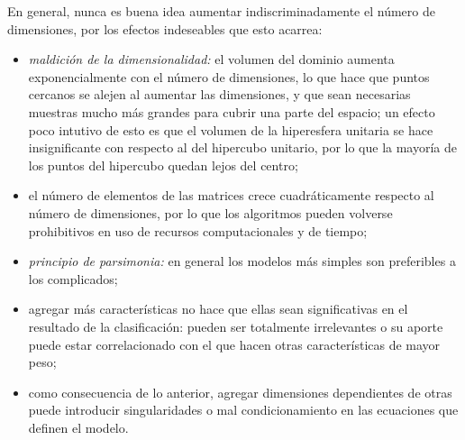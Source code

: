 \documentclass[spanish]{article}
\begin{document}
   En general, nunca es buena idea aumentar indiscriminadamente el número de dimensiones, por los
   efectos indeseables que esto acarrea:
   \begin{itemize}
       \item \emph{maldición de la dimensionalidad:} el volumen del dominio aumenta exponencialmente
           con el número de dimensiones, lo que hace que puntos cercanos se alejen al aumentar las
           dimensiones, y que sean necesarias muestras mucho más grandes para cubrir una parte del
           espacio;  un efecto poco intutivo de esto es que el volumen de la hiperesfera unitaria se
           hace insignificante con respecto al del hipercubo unitario, por lo que la mayoría de los
           puntos del hipercubo quedan lejos del centro;
       \item el número de elementos de las matrices crece cuadráticamente respecto al número de
           dimensiones, por lo que los algoritmos pueden volverse prohibitivos en uso de recursos
           computacionales y de tiempo;
       \item \emph{principio de parsimonia:} en general los modelos más simples son preferibles a
           los complicados;
       \item agregar más características no hace que ellas sean significativas en el resultado de la
           clasificación: pueden ser totalmente irrelevantes o su aporte puede estar correlacionado
           con el que hacen otras características de mayor peso;
       \item como consecuencia de lo anterior, agregar dimensiones dependientes de otras puede
           introducir singularidades o mal condicionamiento en las ecuaciones que definen el modelo.
   \end{itemize}
\end{document}
